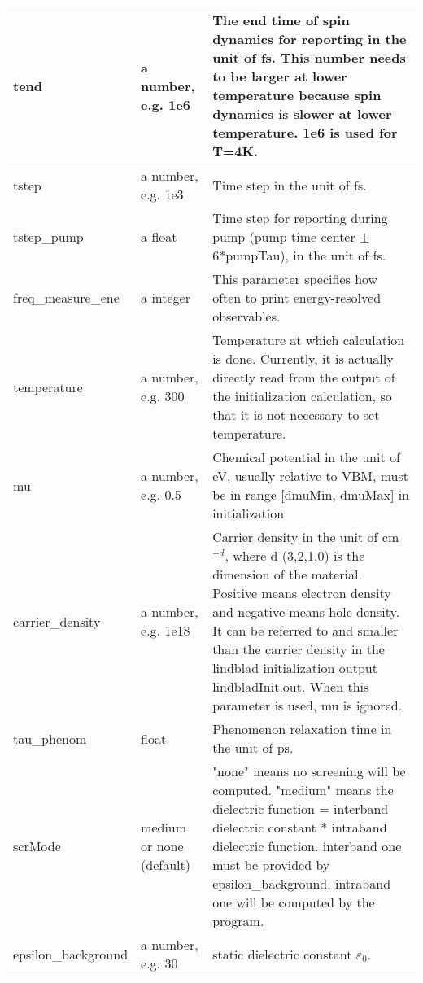 \documentclass{article}
\begin{document}
\begin{xltabular}{\textwidth}{X X X}
		tend & a number, e.g. 1e6 & The end time of spin dynamics for reporting in the unit of fs. This number needs to be larger at lower temperature because spin dynamics is slower at lower temperature. 1e6 is used for T=4K.\\
		\midrule
		
		tstep & a number, e.g. 1e3 & Time step in the unit of fs.\\
		\midrule
		
		tstep\_pump & a float & Time step for reporting during pump (pump time center $\pm$6*pumpTau), in the unit of fs.\\
		\midrule
		
		freq\_measure\_ene & a integer & This parameter specifies how often to print energy-resolved observables.\\
		\midrule
		
		temperature & a number, e.g. 300 & Temperature at which calculation is done. Currently, it is actually directly read from the output of the initialization calculation, so that it is not necessary to set temperature.\\
		\midrule
		
		mu & a number, e.g. 0.5 & Chemical potential in the unit of eV, usually relative to VBM, must be in range [dmuMin, dmuMax] in initialization\\
		\midrule
		
		carrier\_density & a number, e.g. 1e18 & Carrier density in the unit of cm$^{-d}$, where d (3,2,1,0) is the dimension of the material. Positive means electron density and negative means hole density. It can be referred to and smaller than the carrier density in the lindblad initialization output lindbladInit.out. When this parameter is used, mu is ignored.\\
		\midrule
		
		tau\_phenom & float & Phenomenon relaxation time in the unit of ps.\\
		\midrule
		
		scrMode & medium or none (default) & "none" means no screening will be computed. "medium" means the dielectric function = interband dielectric constant * intraband dielectric function. interband one must be provided by epsilon\_background. intraband one will be computed by the program.\\
		\midrule
		
		epsilon\_background & a number, e.g. 30 & static dielectric constant $\varepsilon_0$.\\
		\midrule
		

\end{xltabular}
\end{document}
